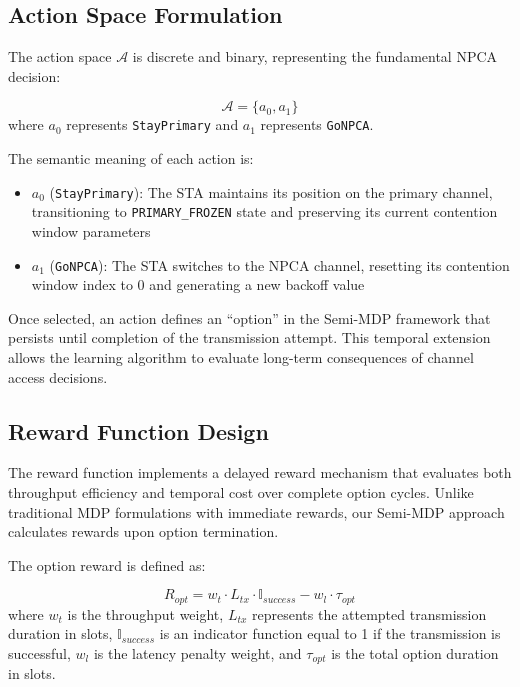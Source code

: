 \documentclass[conference]{IEEEtran}
\begin{document}
\subsection{Action Space Formulation}

The action space $\mathcal{A}$ is discrete and binary, representing the fundamental NPCA decision:

\begin{equation}
\mathcal{A} = \{a_0, a_1\}
\label{eq:action_space}
\end{equation}
where $a_0$ represents \texttt{StayPrimary} and $a_1$ represents \texttt{GoNPCA}.

The semantic meaning of each action is:

\begin{itemize}
\item $a_0$ (\texttt{StayPrimary}): The STA maintains its position on the primary channel, transitioning to \texttt{PRIMARY\_FROZEN} state and preserving its current contention window parameters
\item $a_1$ (\texttt{GoNPCA}): The STA switches to the NPCA channel, resetting its contention window index to 0 and generating a new backoff value
\end{itemize}

Once selected, an action defines an ``option'' in the Semi-MDP framework that persists until completion of the transmission attempt. This temporal extension allows the learning algorithm to evaluate long-term consequences of channel access decisions.

\subsection{Reward Function Design}

The reward function implements a delayed reward mechanism that evaluates both throughput efficiency and temporal cost over complete option cycles. Unlike traditional MDP formulations with immediate rewards, our Semi-MDP approach calculates rewards upon option termination.

The option reward is defined as:

\begin{equation}
R_{opt} = w_t \cdot L_{tx} \cdot \mathbb{I}_{success} - w_l \cdot \tau_{opt}
\label{eq:reward_function}
\end{equation}
where $w_t$ is the throughput weight, $L_{tx}$ represents the attempted transmission duration in slots, $\mathbb{I}_{success}$ is an indicator function equal to 1 if the transmission is successful, $w_l$ is the latency penalty weight, and $\tau_{opt}$ is the total option duration in slots.
\end{document}

